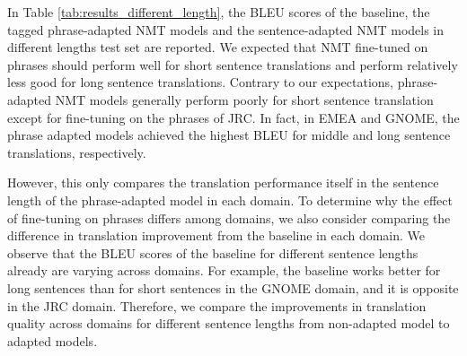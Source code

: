 In Table \ref{tab:results_different_length}, the BLEU scores of the baseline, the tagged phrase-adapted NMT models and the sentence-adapted NMT models in different lengths test set are reported. We expected that NMT fine-tuned on phrases should perform well for short sentence translations and perform relatively less good for long sentence translations. 
Contrary to our expectations, phrase-adapted NMT models generally perform poorly for short sentence translation except for fine-tuning on the phrases of JRC. In fact, in EMEA and GNOME, the phrase adapted models achieved the highest BLEU for middle and long sentence translations, respectively. 

However, this only compares the translation performance itself in the sentence length of the phrase-adapted model in each domain. To determine why the effect of fine-tuning on phrases differs among domains, we also consider comparing the difference in translation improvement from the baseline in each domain. 
We observe that the BLEU scores of the baseline for different sentence lengths already are varying across domains. For example, the baseline works better for long sentences than for short sentences in the GNOME domain, and it is opposite in the JRC domain. Therefore, we compare the improvements in translation quality across domains for different sentence lengths from non-adapted model to adapted models. 



